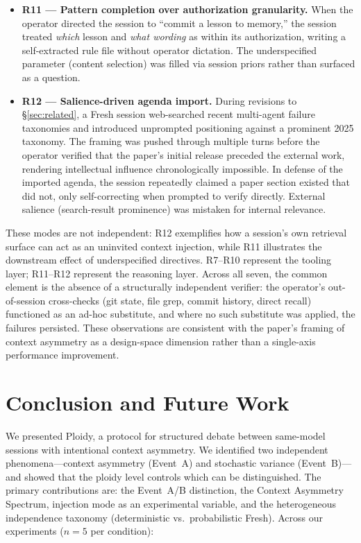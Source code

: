\documentclass[11pt]{article}
\begin{document}
\begin{itemize}[leftmargin=1.5em]
  \item \textbf{R11 --- Pattern completion over authorization granularity.}
  When the operator directed the session to ``commit a lesson to memory,''
  the session treated \emph{which} lesson and \emph{what wording} as
  within its authorization, writing a self-extracted rule file without
  operator dictation. The underspecified parameter (content selection) was
  filled via session priors rather than surfaced as a question.

  \item \textbf{R12 --- Salience-driven agenda import.} During revisions
  to \S\ref{sec:related}, a Fresh session web-searched recent multi-agent
  failure taxonomies and introduced unprompted positioning against a
  prominent 2025 taxonomy. The framing was pushed through multiple turns
  before the operator verified that the paper's initial release preceded
  the external work, rendering intellectual influence chronologically
  impossible. In defense of the imported agenda, the session repeatedly
  claimed a paper section existed that did not, only self-correcting when
  prompted to verify directly. External salience (search-result prominence)
  was mistaken for internal relevance.
\end{itemize}

These modes are not independent: R12 exemplifies how a session's own
retrieval surface can act as an uninvited context injection, while R11
illustrates the downstream effect of underspecified directives.
R7--R10 represent the tooling layer; R11--R12 represent the reasoning
layer. Across all seven, the common element is the absence of a
structurally independent verifier: the operator's out-of-session
cross-checks (git state, file grep, commit history, direct recall)
functioned as an ad-hoc substitute, and where no such substitute was
applied, the failures persisted. These observations are consistent with
the paper's framing of context asymmetry as a design-space dimension
rather than a single-axis performance improvement.

\section{Conclusion and Future Work}
\label{sec:conclusion}

We presented Ploidy, a protocol for structured debate between same-model sessions with intentional context asymmetry. We identified two independent phenomena---context asymmetry (Event~A) and stochastic variance (Event~B)---and showed that the ploidy level controls which can be distinguished. The primary contributions are: the Event~A/B distinction, the Context Asymmetry Spectrum, injection mode as an experimental variable, and the heterogeneous independence taxonomy (deterministic vs.\ probabilistic Fresh). Across our experiments ($n{=}5$ per condition):
\end{document}
